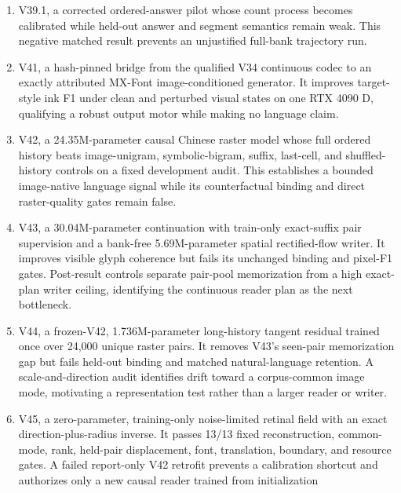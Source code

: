 \documentclass[11pt]{article}
\begin{document}
\begin{enumerate}[leftmargin=*]
  answer-state model. Five distinct font paths, audited paraphrase views,
  nearest semantic negatives, and a full answer map improve prompt reading,
  held-font invariance, and transition geometry on one RTX 4090 D. The frozen
  8,000-update result still fails absolute and transferred answer semantics;
  25/39 conditions pass, so no sealed row or renderer is opened.
  \item V39.1, a corrected ordered-answer pilot whose count process becomes
  calibrated while held-out answer and segment semantics remain weak. This
  negative matched result prevents an unjustified full-bank trajectory run.
  \item V41, a hash-pinned bridge from the qualified V34 continuous codec to an
  exactly attributed MX-Font image-conditioned generator. It improves
  target-style ink F1 under clean and perturbed visual states on one RTX 4090 D,
  qualifying a robust output motor while making no language claim.
  \item V42, a 24.35M-parameter causal Chinese raster model whose full ordered
  history beats image-unigram, symbolic-bigram, suffix, last-cell, and
  shuffled-history controls on a fixed development audit. This establishes a
  bounded image-native language signal while its counterfactual binding and
  direct raster-quality gates remain false.
  \item V43, a 30.04M-parameter continuation with train-only exact-suffix pair
  supervision and a bank-free 5.69M-parameter spatial rectified-flow writer.
  It improves visible glyph coherence but fails its unchanged binding and
  pixel-F1 gates. Post-result controls separate pair-pool memorization from a
  high exact-plan writer ceiling, identifying the continuous reader plan as
  the next bottleneck.
  \item V44, a frozen-V42, 1.736M-parameter long-history tangent residual
  trained once over 24,000 unique raster pairs. It removes V43's seen-pair
  memorization gap but fails held-out binding and matched natural-language
  retention. A scale-and-direction audit identifies drift toward a
  corpus-common image mode, motivating a representation test rather than a
  larger reader or writer.
  \item V45, a zero-parameter, training-only noise-limited retinal field with
  an exact direction-plus-radius inverse. It passes 13/13 fixed reconstruction,
  common-mode, rank, held-pair displacement, font, translation, boundary, and
  resource gates. A failed report-only V42 retrofit prevents a calibration
  shortcut and authorizes only a new causal reader trained from initialization

\end{enumerate}
\end{document}
